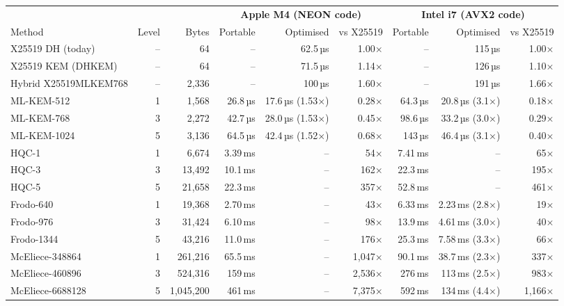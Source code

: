\begin{tabular}{lrrrrrrrr}
\toprule
 & & & \multicolumn{3}{c}{\textbf{Apple M4 (NEON code)}} & \multicolumn{3}{c}{\textbf{Intel i7 (AVX2 code)}} \\ \cmidrule(lr){4-6}\cmidrule(lr){7-9}
Method & Level & Bytes & Portable & Optimised & vs X25519 & Portable & Optimised & vs X25519  \\
\midrule
X25519 DH (today) & – & 64 & – & 62.5\,µs & 1.00× & – & 115\,µs & 1.00×  \\
X25519 KEM (DHKEM) & – & 64 & – & 71.5\,µs & 1.14× & – & 126\,µs & 1.10×  \\
Hybrid X25519MLKEM768 & – & 2,336 & – & 100\,µs & 1.60× & – & 191\,µs & 1.66×  \\
\midrule
ML-KEM-512 & 1 & 1,568 & 26.8\,µs & 17.6\,µs {\scriptsize(1.53×)} & 0.28× & 64.3\,µs & 20.8\,µs {\scriptsize(3.1×)} & 0.18×  \\
ML-KEM-768 & 3 & 2,272 & 42.7\,µs & 28.0\,µs {\scriptsize(1.53×)} & 0.45× & 98.6\,µs & 33.2\,µs {\scriptsize(3.0×)} & 0.29×  \\
ML-KEM-1024 & 5 & 3,136 & 64.5\,µs & 42.4\,µs {\scriptsize(1.52×)} & 0.68× & 143\,µs & 46.4\,µs {\scriptsize(3.1×)} & 0.40×  \\
\midrule
HQC-1 & 1 & 6,674 & 3.39\,ms & – & 54× & 7.41\,ms & – & 65×  \\
HQC-3 & 3 & 13,492 & 10.1\,ms & – & 162× & 22.3\,ms & – & 195×  \\
HQC-5 & 5 & 21,658 & 22.3\,ms & – & 357× & 52.8\,ms & – & 461×  \\
\midrule
Frodo-640 & 1 & 19,368 & 2.70\,ms & – & 43× & 6.33\,ms & 2.23\,ms {\scriptsize(2.8×)} & 19×  \\
Frodo-976 & 3 & 31,424 & 6.10\,ms & – & 98× & 13.9\,ms & 4.61\,ms {\scriptsize(3.0×)} & 40×  \\
Frodo-1344 & 5 & 43,216 & 11.0\,ms & – & 176× & 25.3\,ms & 7.58\,ms {\scriptsize(3.3×)} & 66×  \\
\midrule
McEliece-348864 & 1 & 261,216 & 65.5\,ms & – & 1,047× & 90.1\,ms & 38.7\,ms {\scriptsize(2.3×)} & 337×  \\
McEliece-460896 & 3 & 524,316 & 159\,ms & – & 2,536× & 276\,ms & 113\,ms {\scriptsize(2.5×)} & 983×  \\
McEliece-6688128 & 5 & 1,045,200 & 461\,ms & – & 7,375× & 592\,ms & 134\,ms {\scriptsize(4.4×)} & 1,166×  \\
\bottomrule
\end{tabular}
